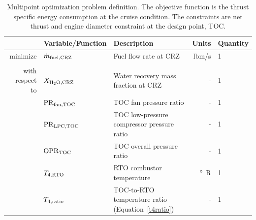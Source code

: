 \documentclass[conf]{new-aiaa}
\begin{document}
\begin{table}[hbt!]
    \centering
    \caption{
        Multipoint optimization problem definition.
        The objective function is the thrust specific energy consumption at the cruise condition.
        The constraints are net thrust and engine diameter constraint at the design point, TOC.
    }
    \small
    \renewcommand{\arraystretch}{1.2}
    \begin{tabular}{r l l r l}
        \toprule
                        & Variable/Function              & Description                                                              & Units          & Quantity \\
        \hline
        minimize        & $\dot{m}_{\rm{fuel,CRZ}} $     & Fuel flow rate at CRZ                                                    & \si{lbm/s}     & 1        \\
                        &                                &                                                                          &                &          \\
        with respect to & $X_{\rm{H_2O,CRZ}}$            & Water recovery mass fraction at CRZ                                      & -              & 1        \\
                        & $\rm{PR}_{\rm{fan,TOC}}$       & TOC fan pressure ratio                                                   & -              & 1        \\
                        & $\rm{PR}_{\rm{LPC,TOC}}$       & TOC low-pressure compressor pressure ratio                               & -              & 1        \\
                        & $\rm{OPR}_{\rm{TOC}}$          & TOC overall pressure ratio                                               & -              & 1        \\
                        & $T_{4,\rm{RTO}}$               & RTO combustor temperature                                                & \si{\degree R} & 1        \\
                        & $T_{4,\rm{ratio}}$             & TOC-to-RTO temperature ratio (Equation~\eqref{t4ratio})                  & -              & 1        \\

\end{tabular}
\end{table}
\end{document}
